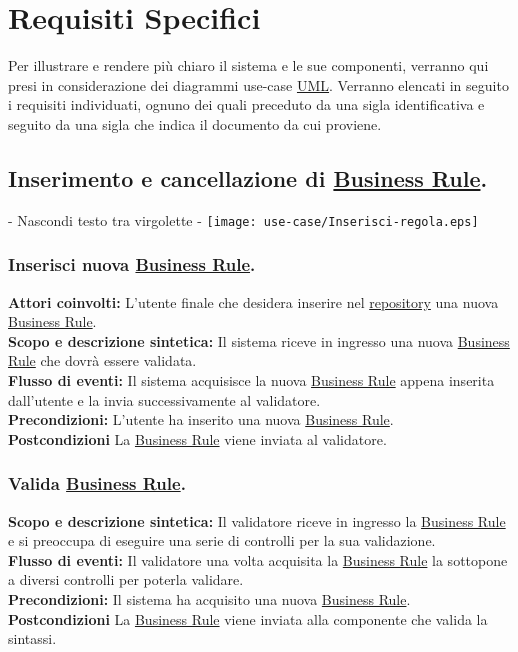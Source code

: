 \chapter{Requisiti Specifici}
Per illustrare e rendere pi\`u chiaro il sistema e le sue componenti, verranno qui presi in considerazione dei diagrammi use-case \underline{UML}. Verranno elencati in seguito i requisiti individuati, ognuno dei quali preceduto da una sigla identificativa e seguito da una sigla che indica il documento da cui proviene.


\section{Inserimento e cancellazione di \underline{Business Rule}.}
\begin{center}- Nascondi testo tra virgolette -
 \texttt{[image: use-case/Inserisci-regola.eps]}
\end{center}

\subsection{Inserisci nuova \underline{Business Rule}.}
\textbf{Attori coinvolti:} L'utente finale che desidera inserire nel \underline{repository} una nuova \underline{Business Rule}.\\
\textbf{Scopo e descrizione sintetica:} Il sistema riceve in ingresso una nuova \underline{Business Rule} che dovr\`a essere validata.\\
\textbf{Flusso di eventi:} Il sistema acquisisce la nuova \underline{Business Rule} appena inserita dall'utente e la invia successivamente al validatore.\\
\textbf{Precondizioni:} L'utente ha inserito una nuova \underline{Business Rule}.\\
\textbf{Postcondizioni} La \underline{Business Rule} viene inviata al validatore.

\subsection{Valida \underline{Business Rule}.}
\textbf{Scopo e descrizione sintetica:} Il validatore riceve in ingresso la \underline{Business Rule} e si preoccupa di eseguire una serie di controlli per la sua validazione.\\
\textbf{Flusso di eventi:} Il validatore una volta acquisita la \underline{Business Rule} la sottopone a diversi controlli per poterla validare.\\
\textbf{Precondizioni:} Il sistema ha acquisito una nuova \underline{Business Rule}.\\
\textbf{Postcondizioni} La \underline{Business Rule} viene inviata alla componente che valida la sintassi.
 
